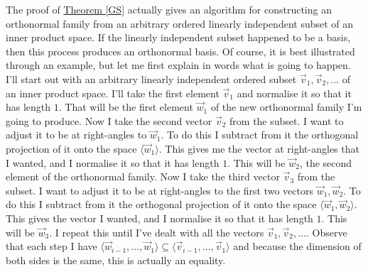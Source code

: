 \documentclass[11pt]{amsbook}
\theoremstyle{definition}
\begin{document}
The proof of \hyperref[GS]{Theorem \ref{GS}} actually gives an algorithm for constructing an orthonormal family from an arbitrary ordered linearly independent subset of an inner product space. If the linearly independent subset happened to be a basis, then this process produces an orthonormal basis. Of course, it is best illustrated through an example, but let me first explain in words what is going to happen. I'll start out with an arbitrary linearly independent ordered subset $\vec{v}_1, \vec{v}_2, \ldots $ of an inner product space. I'll take the first element $\vec{v}_1$ and normalise it so that it has length $1$. That will be the first element $\vec{w}_1$ of the new orthonormal family I'm going to produce. Now I take the second vector $\vec{v}_2$ from the subset. I want to adjust it to be at right-angles to $\vec{w}_1$. To do this I subtract from it the orthogonal projection of it onto the space $\langle \vec{w}_1 \rangle$. This gives me the vector at right-angles that I wanted, and I normalise it so that it has length $1$. This will be $\vec{w}_2$, the second element of the orthonormal family. Now I take the third vector $\vec{v}_3$ from the subset. I want to adjust it to be at right-angles to the first two vectors $\vec{w}_1, \vec{w}_2$. To do this I subtract from it the orthogonal projection of it onto the space $\langle \vec{w}_1, \vec{w}_2 \rangle$. This gives the vector I wanted, and I normalise it so that it has length $1$. This will be $\vec{w}_3$. I repeat this until I've dealt with all the vectors $\vec{v}_1, \vec{v}_2, \ldots$. Observe that each step I have $\langle \vec{w}_{i-1}, \ldots , \vec{w}_1 \rangle \subseteq \langle \vec{v}_{i-1}, \ldots, \vec{v}_1 \rangle$ and because the dimension of both sides is the same, this is actually an equality.
\end{document}
